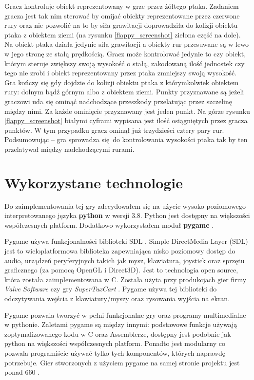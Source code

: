 \documentclass[a4paper, 12pt,twoside]{report}
\begin{document}
Gracz kontroluje obiekt reprezentowany w grze przez żółtego ptaka.
Zadaniem gracza jest tak nim sterować by omijać obiekty reprezentowane przez 
czerwone rury oraz nie pozwolić na to by siła grawitacji doprowadziła do
kolizji obiektu ptaka z obiektem ziemi (na rysunku \ref{flappy_screenshot}
zielona część na dole). Na obiekt ptaka działa jedynie siła grawitacji a
obiekty rur przesuwane są w lewo w jego stronę ze stałą prędkością. Gracz
może kontrolować jedynie to czy obiekt, którym steruje zwiększy swoją
wysokość o stałą, zakodowaną ilość jednostek czy tego nie zrobi i obiekt
reprezentowany przez ptaka zmniejszy swoją wysokość. Gra kończy się gdy
dojdzie do kolizji obiektu ptaka z którymkolwiek obiektem rury: dolnym
bądź górnym albo z obiektem ziemi. Punkty przyznawane są jeżeli graczowi uda
się ominąć nadchodzące przeszkody przelatując przez szczelinę między nimi.
Za każde ominięcie przyznawany jest jeden punkt. Na górze rysunku
\ref{flappy_screenshot} białymi cyframi wypisana jest ilość osiągniętych przez
gracza punktów. W tym przypadku gracz ominął już trzydzieści cztery pary rur.
Podsumowując -- gra sprowadza się do kontrolowania wysokości ptaka tak by ten
przelatywał między nadchodzącymi rurami.

\section{Wykorzystane technologie}
Do zaimplementowania tej gry zdecydowałem się na użycie wysoko poziomowego
interpretowanego języka \textbf{python} w wersji 3.8. Python jest dostępny na
większości współczesnych platform.
Dodatkowo wykorzystałem moduł \textbf{pygame} \cite{pygame_about_ref}.

Pygame używa funkcjonalności biblioteki SDL \cite{sdl_ref}. Simple DirectMedia
Layer (SDL) jest to wieloplatformowa biblioteka zapewniająca nisko poziomowy
dostęp do audio, urządzeń peryferyjnych takich jak mysz, klawiatura, joystick
oraz sprzętu graficznego (za pomocą OpenGL i Direct3D). Jest to technologia
open source, która została zaimplementowana w C. Została użyta przy produkcjach
gier firmy \textit{Valve Software} czy gry \textit{SuperTuxCart}
\cite{sdl_ref}. Pygame używa tej biblioteki do odczytywania wejścia z
klawiatury/myszy oraz rysowania wyjścia na ekran.

Pygame pozwala tworzyć w pełni funkcjonalne gry oraz programy multimedialne
w pythonie. Zaletami pygame są między innymi: podstawowe funkcje używają
zoptymalizowanego kodu w C oraz Assemblerze, dostępny jest podobnie jak python
na większości współczesnych platform. Ponadto jest modularny co pozwala
programiście używać tylko tych komponentów, których naprawdę potrzebuje.
Gier stworzonych z użyciem pygame na samej stronie projektu jest ponad
660 \cite{pygame_about_ref}.
\end{document}

